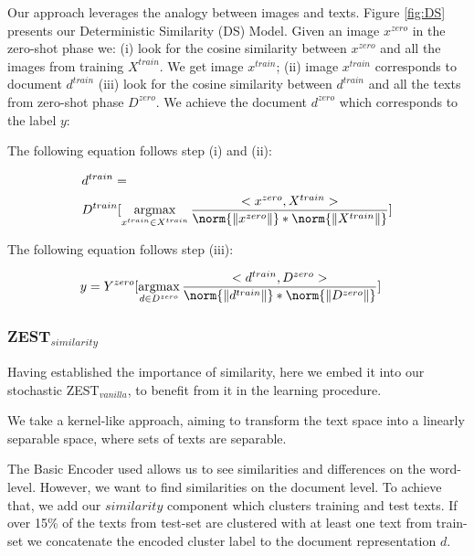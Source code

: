 \documentclass[11pt,a4paper]{article}
\begin{document}
Our approach leverages the analogy between images and texts. Figure \ref{fig:DS} presents our Deterministic Similarity (DS) Model. Given an image $x^{zero}$ in the zero-shot phase we: (i) look for the cosine similarity between $x^{zero}$ and all the images from training $X^{train}$. We get image $x^{train}$; (ii) image $x^{train}$ corresponds to document $d^{train}$ (iii)
look for the cosine similarity between $d^{train}$ and all the texts from zero-shot phase $D^{zero}$. We achieve the document $d^{zero}$ which corresponds to the label $y$:


The following equation follows step (i) and (ii):

\begin{equation}
\begin{aligned}
\begin{split}
&d^{train}= \\
&D^{train}[
\operatorname*{argmax}_{x^{train}\in X^{train} } \frac{<x^{zero},X^{train}>}{\norm{\| x^{zero}\| }*\norm{\| X^{train}\| }}]
\end{split}

\end{aligned}
\end{equation}

The following equation follows step (iii):

\begin{equation}
\begin{aligned}
\begin{split}
&y=Y^{zero}[
\operatorname*{argmax}_{d\in D^{zero}} \frac{<d^{train},D^{zero}>}{\norm{\| d^{train}\| }*\norm{\| D^{zero}\| }}]
\end{split}

\end{aligned}
\end{equation}

\subsubsection{ZEST$_{similarity}$}

Having established the importance of similarity, here we embed it into our stochastic ZEST$_{vanilla}$, to benefit from it in the learning procedure. \par

We take a kernel-like approach, aiming to transform the text space into a linearly separable space, where sets of texts are separable. \par

The Basic Encoder used allows us to see similarities and differences on the word-level. However, we want to find similarities on the document level. To achieve that, we add our $similarity$ component which clusters training and test texts. If over 15\% of the texts from test-set are clustered with at least one text from train-set we concatenate the encoded cluster label to the document representation $d$. \par
\end{document}
